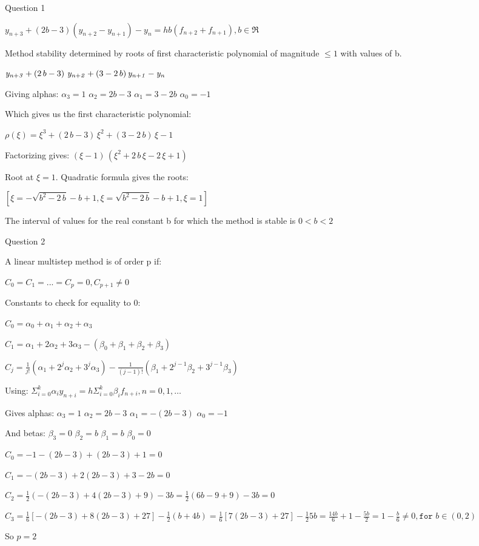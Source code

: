 \documentclass{beamer}
\begin{document}
\begin{frame}{Question 1}

$y_{n+3} + (2b - 3)(y_{n+2} - y_{n+1}) - y_n = hb(f_{n+2} + f_{n+1}), b \in \Re$

Method stability determined by roots of first characteristic polynomial of magnitude $\le 1$ with values of b.

${\it y_{n+3}}+\left(2\,b-3\right)\,{\it y_{n+2}}+\left(3-2\,b\right) {\it y_{n+1}}-{\it y_n}$

Giving alphas: $\alpha_3 = 1$ $\alpha_2 = 2b - 3$ $\alpha_1 = 3 - 2b$ $\alpha_0 = -1$

Which gives us the first characteristic polynomial:

$\rho(\xi) = \xi^3+\left(2\,b-3\right)\,\xi^2+\left(3-2\,b\right)\,\xi-1$

Factorizing gives: $\left(\xi-1\right)\,\left(\xi^2+2\,b\,\xi-2\,\xi+1\right)$

Root at $\xi = 1$. Quadratic formula gives the roots:

$\left[ \xi=-\sqrt{b^2-2\,b}-b+1 , \xi=\sqrt{b^2-2\,b}-b+1 , \xi=1 \right]$

The interval of values for the real constant b for which the method is stable is $0 < b < 2$
\end{frame}

\begin{frame}{Question 2}

A linear multistep method is of order p if:

$C_0 = C_1 = ... = C_p = 0, C_{p+1} \ne 0$

Constants to check for equality to 0:

$C_0 = \alpha_0 + \alpha_1 + \alpha_2 + \alpha_3$

$C_1 = \alpha_1 + 2\alpha_2 + 3\alpha_3 - (\beta_0 + \beta_1 + \beta_2 + \beta_3)$

$C_j = \frac{1}{j!} (\alpha_1 + 2^j\alpha_2 + 3^j\alpha_3) - \frac{1}{(j-1)!} (\beta_1 + 2^{j-1}\beta_2 + 3^{j-1}\beta_3)$

Using: $\Sigma_{i=0}^{k}\alpha_iy_{n+i} = h \Sigma_{i=0}^{k} \beta_i f_{n+i}, n=0,1,\ldots$

Gives alphas: $\alpha_3 = 1$ $\alpha_2 = 2b - 3$ $\alpha_1 = -(2b - 3)$ $\alpha_0 = -1$

And betas: $\beta_3 = 0$ $\beta_2 = b$ $\beta_1 = b$ $\beta_0 = 0$

$C_0 = -1 - (2b - 3) + (2b - 3) + 1 = 0$

$C_1 = -(2b - 3) + 2(2b-3) + 3 - 2b = 0$

$C_2 = \frac{1}{2}(-(2b-3) + 4(2b-3) + 9) - 3b = \frac{1}{2} (6b - 9 + 9) - 3b = 0$

$C_3 = \frac{1}{6}[-(2b-3) + 8(2b-3) + 27] - \frac{1}{2}(b+4b) = \frac{1}{6}[7(2b-3) + 27] - \frac{1}{2}5b = \frac{14b}{6} + 1 - \frac{5b}{2} = 1 - \frac{b}{6} \ne 0, \texttt{for } b \in (0,2)$

So $p = 2$

\end{frame}
\end{document}
